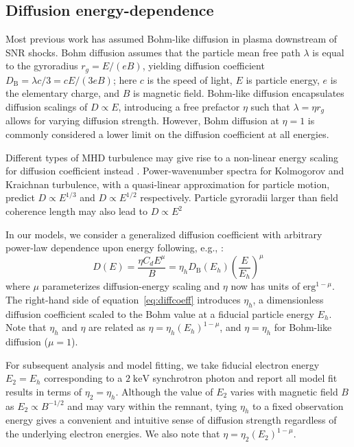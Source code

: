 \documentclass[iop, apj, numberedappendix]{emulateapj}
\newcommand*{\mt}{\mathrm}
\newcommand*{\unit}[1]{\;\mt{#1}}  %
\begin{document}
\subsection{Diffusion energy-dependence} \label{sec:diffcoeff}

Most previous work has assumed Bohm-like diffusion in plasma downstream of SNR
shocks.  Bohm diffusion assumes that the particle mean free path $\lambda$ is
equal to the gyroradius $r_g = E/(eB)$, yielding diffusion coefficient
$D_{\mt{B}} = \lambda c / 3 = c E / (3 e B)$; here $c$ is the speed of light,
$E$ is particle energy, $e$ is the elementary charge, and $B$ is magnetic
field.  Bohm-like diffusion encapsulates diffusion scalings of $D \propto E$,
introducing a free prefactor $\eta$ such that $\lambda = \eta r_g$ allows for
varying diffusion strength.  However, Bohm diffusion at $\eta = 1$ is commonly
considered a lower limit on the diffusion coefficient at all energies.

Different types of MHD turbulence may give rise to a non-linear energy
scaling for diffusion coefficient instead \citep{giacalone1999, reynolds2004}.
Power-wavenumber spectra for Kolmogorov and Kraichnan turbulence, with a
quasi-linear approximation for particle motion,
predict $D \propto E^{1/3}$ and $D \propto E^{1/2}$ respectively.
Particle gyroradii larger than field coherence length may also lead to
$D \propto E^{2}$ 

In our models, we consider a generalized diffusion coefficient with arbitrary
power-law dependence upon energy following, e.g., \citet{parizot2006}:
\begin{equation} \label{eq:diffcoeff}
    D(E) = \frac{\eta C_d E^\mu}{B}
         = \eta_h D_{\mt{B}}\left(E_h\right) \left(\frac{E}{E_h}\right)^\mu
\end{equation}
where $\mu$ parameterizes diffusion-energy scaling and $\eta$ now has units
of $\mt{erg}^{1-\mu}$.  The right-hand side of equation~\eqref{eq:diffcoeff}
introduces $\eta_h$, a dimensionless diffusion coefficient scaled to the Bohm
value at a fiducial particle energy $E_h$.  Note that $\eta_h$ and $\eta$ are
related as $\eta = \eta_h (E_h)^{1-\mu}$, and $\eta = \eta_h$ for Bohm-like
diffusion ($\mu = 1$).

For subsequent analysis and model fitting, we take fiducial electron energy
$E_2 = E_h$ corresponding to a $2 \unit{keV}$ synchrotron photon and report all
model fit results in terms of $\eta_2 = \eta_h$.  Although the value of $E_2$
varies with magnetic field $B$ as $E_2 \propto B^{-1/2}$ and may vary within
the remnant, tying $\eta_h$ to a fixed observation energy gives a convenient
and intuitive sense of diffusion strength regardless of the underlying electron
energies.  We also note that $\eta = \eta_2 (E_2)^{1-\mu}$.
\end{document}

